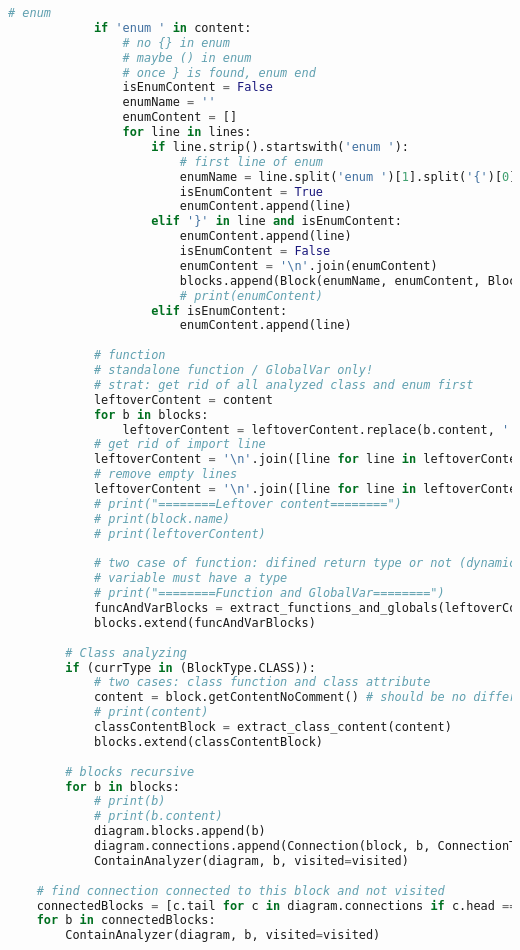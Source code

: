 \begin{lstlisting}[language=Python, caption={$\texttt{ContainAnalyzer}$ function.}, label={lst:10}]
            # enum
            if 'enum ' in content:
                # no {} in enum
                # maybe () in enum
                # once } is found, enum end
                isEnumContent = False
                enumName = ''
                enumContent = []
                for line in lines:
                    if line.strip().startswith('enum '):
                        # first line of enum
                        enumName = line.split('enum ')[1].split('{')[0].strip()
                        isEnumContent = True
                        enumContent.append(line)
                    elif '}' in line and isEnumContent:
                        enumContent.append(line)
                        isEnumContent = False
                        enumContent = '\n'.join(enumContent)
                        blocks.append(Block(enumName, enumContent, BlockType.ENUM))
                        # print(enumContent)
                    elif isEnumContent:
                        enumContent.append(line)
                
            # function
            # standalone function / GlobalVar only!
            # strat: get rid of all analyzed class and enum first
            leftoverContent = content
            for b in blocks:
                leftoverContent = leftoverContent.replace(b.content, '')
            # get rid of import line
            leftoverContent = '\n'.join([line for line in leftoverContent.split('\n') if not line.strip().startswith('import')])
            # remove empty lines
            leftoverContent = '\n'.join([line for line in leftoverContent.split('\n') if line.strip() != ''])
            # print("========Leftover content========")
            # print(block.name)
            # print(leftoverContent)
            
            # two case of function: difined return type or not (dynamic)
            # variable must have a type
            # print("========Function and GlobalVar========")
            funcAndVarBlocks = extract_functions_and_globals(leftoverContent)
            blocks.extend(funcAndVarBlocks)
        
        # Class analyzing
        if (currType in (BlockType.CLASS)):
            # two cases: class function and class attribute
            content = block.getContentNoComment() # should be no difference between content and contentNoComment
            # print(content)
            classContentBlock = extract_class_content(content)
            blocks.extend(classContentBlock)
            
        # blocks recursive
        for b in blocks:
            # print(b)
            # print(b.content)
            diagram.blocks.append(b)
            diagram.connections.append(Connection(block, b, ConnectionType.CONTAIN))
            ContainAnalyzer(diagram, b, visited=visited)
            
    # find connection connected to this block and not visited
    connectedBlocks = [c.tail for c in diagram.connections if c.head == block and c.tail not in visited]
    for b in connectedBlocks:
        ContainAnalyzer(diagram, b, visited=visited)    
\end{lstlisting}
